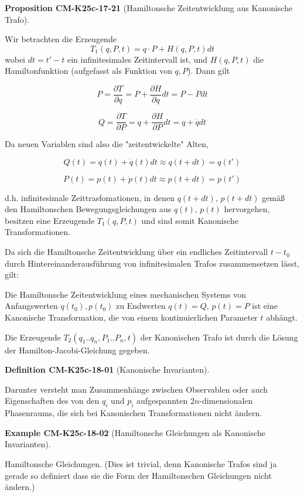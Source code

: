 \documentclass[10pt, letterpaper]{article}
\newcommand{\CustomHeading}[3]{%
  \par\medskip\noindent%
  \textbf{#1 #2} \textnormal{(#3)}.\enskip%
}
\newenvironment{DEF}[2]{\CustomHeading{Definition}{#1}{#2}}{}
\newenvironment{PROP}[2]{\CustomHeading{Proposition}{#1}{#2}}{}
\newenvironment{EXA}[2]{\CustomHeading{Example}{#1}{#2}}{}
\begin{document}
\begin{PROP}{CM-K25c-17-21}{Hamiltonsche Zeitentwicklung aus Kanonische Trafo}
Wir betrachten die Erzeugende 
$$T_1(q,P,t) = q\cdot P + H(q,P,t)dt$$ 
wobei $dt = t'-t$ ein infinitesimales Zeitintervall ist, und $H(q,P,t)$ die Hamiltonfunktion (aufgefasst als Funktion von $q,P$). Dann gilt

\[
P = \frac{\partial T}{\partial q} = P + \frac{\partial H}{\partial q}dt = P - \dot{P}dt
\]

\[
Q = \frac{\partial T}{\partial P} = q + \frac{\partial H}{\partial P}dt = q + \dot{q}dt
\]

Da neuen Variablen sind also die "zeitentwickelte" Alten,

\[
Q(t) = q(t) + \dot{q}(t)dt \approx q(t+dt) = q(t')
\]

\[
P(t) = p(t) + \dot{p}(t)dt \approx p(t+dt) = p(t')
\]

d.h. infinitesimale Zeittrasfomationen, in denen $q(t+dt)$, $p(t+dt)$ gemäß den Hamiltonschen Bewegungsgleichungen aus $q(t)$, $p(t)$ hervorgehen, besitzen eine Erzeugende $T_1(q,P,t)$ und sind somit Kanonische Transformationen.

Da sich die Hamiltonsche Zeitentwicklung über ein endliches Zeitintervall $t-t_0$ durch Hintereinanderausführung von infinitesimalen Trafos zusammensetzen lässt, gilt:

Die Hamiltonsche Zeitentwicklung eines mechanischen Systems von Anfangswerten $q(t_0), p(t_0)$ zu Endwerten $q(t) = Q$, $p(t) = P$ ist eine Kanonische Transformation, die von einem kontinuierlichen Parameter $t$ abhängt.


Die Erzeugende $T_2(q_1..q_n, P_1..P_n,t)$ der Kanonischen Trafo ist durch die Lösung der Hamilton-Jacobi-Gleichung gegeben.
\end{PROP}

\begin{DEF}{CM-K25c-18-01}{Kanonische Invarianten}
Darunter versteht man Zusammenhänge zwischen Observablen oder auch Eigenschaften des von den $q_i$ und $p_i$ aufgespannten $2n$-dimensionalen Phasenraums, die sich bei Kanonischen Transformationen nicht ändern.
\end{DEF}

\begin{EXA}{CM-K25c-18-02}{Hamiltonsche Gleichungen als Kanonische Invarianten}
Hamiltonsche Gleichungen. (Dies ist trivial, denn Kanonische Trafos sind ja gerade so definiert dass sie die Form der Hamiltonschen Gleichungen nicht ändern.)
\end{EXA}
\end{document}
